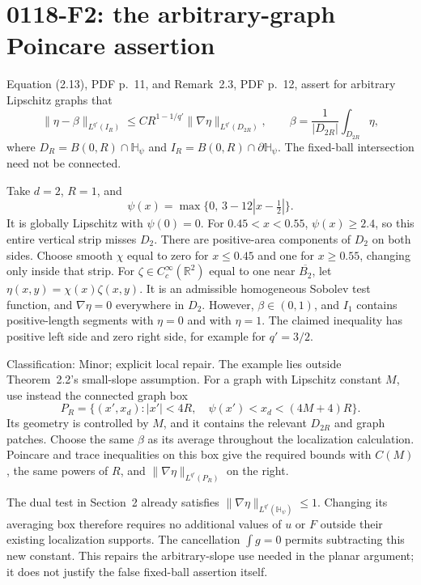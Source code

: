 \documentclass[10pt]{article}
\begin{document}
\section*{0118-F2: the arbitrary-graph Poincare assertion}
Equation (2.13), PDF p. 11, and Remark 2.3, PDF p. 12, assert for arbitrary Lipschitz graphs that \[\|\eta-\beta\|_{L^{q'}(I_R)}
 \le CR^{1-1/q'}\|\nabla\eta\|_{L^{q'}(D_{2R})},
 \qquad \beta=\frac1{|D_{2R}|}\int_{D_{2R}}\eta,\] where \(D_R=B(0,R)\cap\mathbb H_\psi\) and \(I_R=B(0,R)\cap\partial\mathbb H_\psi\). The fixed-ball intersection need not be connected.\par
Take \(d=2\), \(R=1\), and \[\psi(x)=\max\{0,\,3-12|x-\tfrac12|\}.\] It is globally Lipschitz with \(\psi(0)=0\). For \(0.45<x<0.55\), \(\psi(x)\ge2.4\), so this entire vertical strip misses \(D_2\). There are positive-area components of \(D_2\) on both sides. Choose smooth \(\chi\) equal to zero for \(x\le0.45\) and one for \(x\ge0.55\), changing only inside that strip. For \(\zeta\in C^\infty_c(\mathbb R^2)\) equal to one near \(\overline{B_2}\), let \(\eta(x,y)=\chi(x)\zeta(x,y)\). It is an admissible homogeneous Sobolev test function, and \(\nabla\eta=0\) everywhere in \(D_2\). However, \(\beta\in(0,1)\), and \(I_1\) contains positive-length segments with \(\eta=0\) and with \(\eta=1\). The claimed inequality has positive left side and zero right side, for example for \(q'=3/2\).\par
Classification: Minor; explicit local repair. The example lies outside Theorem 2.2’s small-slope assumption. For a graph with Lipschitz constant \(M\), use instead the connected graph box \[P_R=\{(x',x_d):|x'|<4R,\quad
               \psi(x')<x_d<(4M+4)R\}.\] Its geometry is controlled by \(M\), and it contains the relevant \(D_{2R}\) and graph patches. Choose the same \(\beta\) as its average throughout the localization calculation. Poincare and trace inequalities on this box give the required bounds with \(C(M)\), the same powers of \(R\), and \(\|\nabla\eta\|_{L^{q'}(P_R)}\) on the right.\par
The dual test in Section 2 already satisfies \(\|\nabla\eta\|_{L^{q'}(\mathbb H_\psi)}\le1\). Changing its averaging box therefore requires no additional values of \(u\) or \(F\) outside their existing localization supports. The cancellation \(\int g=0\) permits subtracting this new constant. This repairs the arbitrary-slope use needed in the planar argument; it does not justify the false fixed-ball assertion itself.\par
\end{document}
